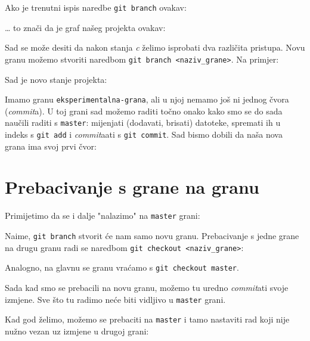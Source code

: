 Ako je trenutni ispis naredbe \verb+git branch+ ovakav:



\dots{} to znači da je graf našeg projekta ovakav:



Sad se može desiti da nakon stanja \emph c želimo isprobati dva različita pristupa.
Novu granu možemo stvoriti naredbom \verb+git branch <naziv_grane>+.
Na primjer:


Sad je novo stanje projekta:



Imamo granu \verb+eksperimentalna-grana+, ali u njoj nemamo još ni jednog čvora (\emph{commit}a).
U toj grani sad možemo raditi točno onako kako smo se do sada naučili raditi s \verb+master+: mijenjati (dodavati, brisati) datoteke, spremati ih u indeks s \verb+git add+ i \emph{commit}aati s \verb+git commit+.
Sad bismo dobili da naša nova grana ima svoj prvi čvor: 



\section*{Prebacivanje s grane na granu}

Primijetimo da se i dalje "nalazimo" na \verb+master+ grani:



Naime, \verb+git branch+ stvorit će nam samo novu granu.
Prebacivanje s jedne grane na drugu granu radi se naredbom \verb+git checkout <naziv_grane>+:



Analogno, na glavnu se granu vraćamo s \verb+git checkout master+.

Sada kad smo se prebacili na novu granu, možemo tu uredno \emph{commit}ati svoje izmjene. 
Sve što tu radimo neće biti vidljivo u \verb+master+ grani.



Kad god želimo, možemo se prebaciti na \verb+master+ i tamo nastaviti rad koji nije nužno vezan uz izmjene u drugoj grani:



